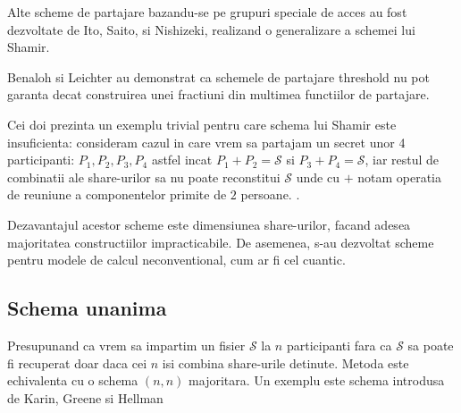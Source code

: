 \documentclass{llncs}
\begin{document}
Alte scheme de partajare bazandu-se pe grupuri speciale de acces au fost dezvoltate de Ito, Saito, si Nishizeki, realizand o generalizare a schemei lui Shamir. \cite{ITO:1989}

Benaloh si Leichter au demonstrat ca schemele de partajare threshold nu pot garanta decat construirea unei fractiuni din multimea functiilor de partajare.

Cei doi prezinta un exemplu trivial pentru care schema lui Shamir este insuficienta: consideram cazul in care vrem sa partajam un secret unor 4 participanti: $P_1, P_2, P_3, P_4$ astfel incat $P_1 + P_2 = \mathcal{S}$ si $P_3 + P_4 = \mathcal{S}$, iar restul de combinatii ale share-urilor sa nu poate reconstitui $\mathcal{S}$ unde cu $+$ notam operatia de reuniune a componentelor primite de $2$ persoane. \cite{JJ:1990}.

Dezavantajul acestor scheme este dimensiunea share-urilor, facand adesea majoritatea constructiilor impracticabile. \cite{Survey:2011}
De asemenea, s-au dezvoltat scheme pentru modele de calcul neconventional, cum ar fi cel cuantic. \cite{hillery:1999} %

\subsection{Schema unanima}

Presupunand ca vrem sa impartim un fisier $\mathcal{S}$ la $n$ participanti fara ca $\mathcal{S}$ sa poate fi recuperat doar daca cei $n$ isi combina share-urile detinute. Metoda este echivalenta cu o schema $(n, n)$ majoritara. Un exemplu este schema introdusa de Karin, Greene si Hellman \cite{Karnin:83}
\end{document}
